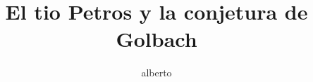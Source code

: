 \documentclass[12pt,a4paper]{report}
\author{alberto}
\begin{document}
\title{El tio Petros y la conjetura de Golbach}
\end{document}

